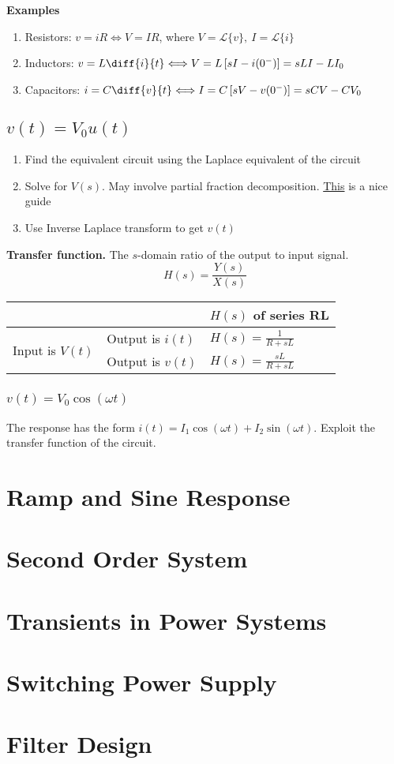\documentclass[a4paper,11pt]{article}
\begin{document}
	\textbf{Examples}
	\begin{enumerate}
		\item Resistors: $v = iR \Longleftrightarrow V = IR$, where $V = \mathcal{L}\{v\},~I = \mathcal{L}\{i\}$
		\item Inductors: $v = L\diff{i}{t} \Longleftrightarrow V = L\left[sI - i(0^-)\right] = sLI - LI_0$
		\item Capacitors: $i = C\diff{v}{t} \Longleftrightarrow I = C\left[sV - v(0^-)\right] = sCV - CV_0$ 
	\end{enumerate}
	
	\subsection{$v(t) = V_0u(t)$}
	\begin{enumerate}
		\item Find the equivalent circuit using the Laplace equivalent of the circuit
		\item Solve for $V(s)$. May involve partial fraction decomposition. \href{https://cnx.org/exports/b2e3f8ad-9e60-4421-a343-97e64192ffce\%4015.pdf/partial-fraction-expansion-15.pdf}{This} is a nice guide
		\item Use Inverse Laplace transform to get $v(t)$ 
	\end{enumerate}
	\textbf{Transfer function.} The $s$-domain ratio of the output to input signal. 
	\begin{equation}
	H(s) = \frac{Y(s)}{X(s)}
	\end{equation}
	\begin{center}
	\begin{tabular}{|l|l|l|}
		\hline
		& & $H(s)$ of series RL \\ \hline
		\multirow{2}{*}{Input is $V(t)$} & Output is $i(t)$ & $H(s) = \frac{1}{R + sL}$ \\ \cline{2-3}
		& Output is $v(t)$ & $H(s) = \frac{sL}{R + sL}$ \\ \hline
	\end{tabular}
	\end{center}
	
	\subsubsection{$v(t) = V_0\cos(\omega t)$}
	The response has the form $i(t) = I_1\cos(\omega t) + I_2\sin(\omega t)$. Exploit the transfer function of the circuit. 
	
	\section{Ramp and Sine Response}
	\section{Second Order System}
	\section{Transients in Power Systems}
	\section{Switching Power Supply}
	\section{Filter Design}
	
	
\end{document}
